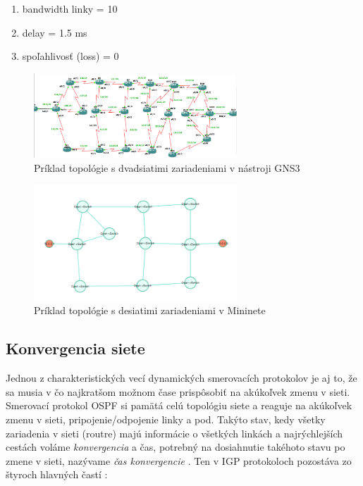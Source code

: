 \documentclass[conference]{IEEEtran}
\begin{document}
\begin{enumerate}
\item{bandwidth linky = 10}
\item{delay = 1.5 ms}
\item{spoľahlivosť (loss) = 0}
\end{enumerate}

\begin{figure}[h!]
\centering
\includegraphics[width=3in]{../img/topology}
\caption{Príklad topológie s dvadsiatimi zariadeniami v nástroji GNS3}
\end{figure}

\begin{figure}[h!]
\centering
\includegraphics[width=3in]{../img/topologySDN}
\caption{Príklad topológie s desiatimi zariadeniami v Mininete}
\end{figure}

\subsection{Konvergencia siete}

Jednou z charakteristických vecí dynamických smerovacích protokolov je aj to, že sa musia v čo najkratšom možnom čase prispôsobiť na akúkoľvek zmenu v sieti. Smerovací protokol OSPF si pamätá celú topológiu siete a reaguje na akúkoľvek zmenu v sieti, pripojenie/odpojenie linky a pod. Takýto stav, kedy všetky zariadenia v sieti (routre) majú informácie o všetkých linkách a najrýchlejších cestách voláme \textit{konvergencia} a čas, potrebný na dosiahnutie takéhoto stavu po zmene v sieti, nazývame \textit{čas konvergencie} \cite{seventh}.  
Ten v IGP protokoloch pozostáva zo štyroch hlavných častí \cite{eigth}: 
\end{document}
